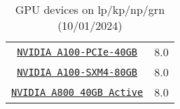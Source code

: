 \begin{frame}
\begin{table}[H]
\begin{center}
\begin{tabular}{c|c}
	  \href{https://www.nvidia.com/content/dam/en-zz/Solutions/Data-Center/a100/pdf/nvidia-a100-datasheet-us-nvidia-1758950-r4-web.pdf}{\small{\texttt{NVIDIA A100-PCIe-40GB}}} & \small{8.0} \\
	  \href{https://www.nvidia.com/content/dam/en-zz/Solutions/Data-Center/a100/pdf/nvidia-a100-datasheet-us-nvidia-1758950-r4-web.pdf}{\small{\texttt{NVIDIA A100-SXM4-80GB}}} & \small{8.0} \\
	  \href{https://www.nvidia.com/en-us/design-visualization/a800/}{\small{\texttt{NVIDIA A800 40GB Active}}} & \small{8.0}  \\
        \hline
    \end{tabular}
   \end{center} 
   \caption{GPU devices on lp/kp/np/grn (10/01/2024)}
\end{table}
\end{frame} 

